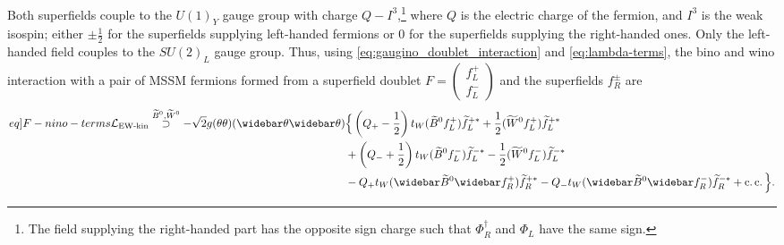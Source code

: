 \documentclass[english, notitlepage]{article}
\begin{document}
            Both superfields couple to the ${U(1)}_Y$ gauge group with charge $Q-I^3$,\footnote{The field supplying the right-handed part has the opposite sign charge such that $\Phi^\dag_R$ and $\Phi_L$ have the same sign.}
            where $Q$ is the electric charge of the fermion, and $I^3$ is the weak isospin; either $\pm \frac{1}{2}$ for the superfields supplying left-handed fermions or 0 for the superfields supplying the right-handed ones.
            Only the left-handed field couples to the ${SU(2)}_L$ gauge group.
            Thus, using \cref{eq:gaugino_doublet_interaction} and \cref{eq:lambda-terms}, the bino and wino interaction with a pair of MSSM fermions formed from a superfield doublet $F = \begin{pmatrix} f_L^+ \\ f_L^- \end{pmatrix}$ and the superfields $f_R^\pm$ are
            \begin{align}
                \label[eq]{F-nino-terms}
                \nonumber
                \L_{\text{EW-kin}} \stackrel{\bino, \wino}{\supset} -\sqrt{2} g (\theta\theta)(\wbar\theta\wbar\theta) & \Big\{ \pclosed{Q_+-\frac{1}{2}}t_W (\bino f_L^+) \wtilde{f}_L^{+*} + \frac{1}{2} (\wino f_L^+) \wtilde{f}_L^{+*}                     \\
                \nonumber
                                                                                                                       & + \pclosed{Q_-+\frac{1}{2}}t_W (\bino f_L^-)\wtilde{f}_L^{-*} - \frac{1}{2} (\wino f_L^-)\wtilde{f}_L^{-*}                            \\
                                                                                                                       & - Q_+t_W (\wbar{\wtilde{B}}^0\wbar{f}_R^+)\wtilde{f}_R^{+*} - Q_-t_W (\wbar{\wtilde{B}}^0\wbar{f}_R^-)\wtilde{f}_R^{-*} + \cc \Big\}.
            \end{align}
\end{document}
